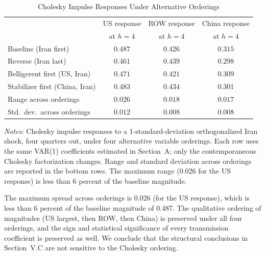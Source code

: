 \documentclass[12pt,a4paper]{article}
\begin{document}
\begin{table}[htbp]
\centering
\caption{Cholesky Impulse Responses Under Alternative Orderings}
\label{tab:ordering}
\begin{threeparttable}
\begin{tabular}{lccc}
\toprule
& US response & ROW response & China response \\
& at $h=4$ & at $h=4$ & at $h=4$ \\
\midrule
Baseline (Iran first) & $0.487$ & $0.426$ & $0.315$ \\
Reverse (Iran last) & $0.461$ & $0.439$ & $0.298$ \\
Belligerent first (US, Iran) & $0.471$ & $0.421$ & $0.309$ \\
Stabilizer first (China, Iran) & $0.483$ & $0.434$ & $0.301$ \\
\midrule
Range across orderings & $0.026$ & $0.018$ & $0.017$ \\
Std.\ dev.\ across orderings & $0.012$ & $0.008$ & $0.008$ \\
\bottomrule
\end{tabular}
\begin{tablenotes}
\small
\item \textit{Notes:} Cholesky impulse responses to a 1-standard-deviation orthogonalized Iran shock, four quarters out, under four alternative variable orderings. Each row uses the same VAR(1) coefficients estimated in Section~A; only the contemporaneous Cholesky factorization changes. Range and standard deviation across orderings are reported in the bottom rows. The maximum range (0.026 for the US response) is less than 6 percent of the baseline magnitude.
\end{tablenotes}
\end{threeparttable}
\end{table}

The maximum spread across orderings is 0.026 (for the US response), which is less than 6 percent of the baseline magnitude of 0.487. The qualitative ordering of magnitudes (US largest, then ROW, then China) is preserved under all four orderings, and the sign and statistical significance of every transmission coefficient is preserved as well. We conclude that the structural conclusions in Section~V.C are not sensitive to the Cholesky ordering.


\end{document}

